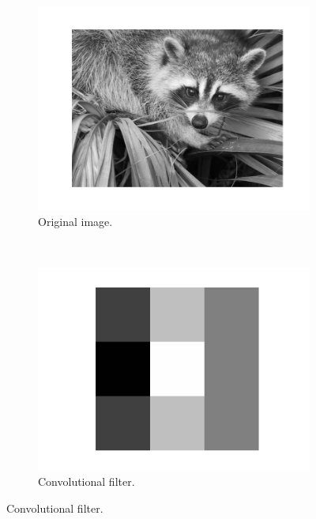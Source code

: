         \begin{figure}
            \centering
            \begin{subfigure}[t]{0.3\textwidth}
                \centering
                \includegraphics[width=\textwidth]{images/face.png}
                \caption{Original image.}
                \label{fig:convolution-face-original}
            \end{subfigure}%
            ~
            \begin{subfigure}[t]{0.3\textwidth}
                \centering
                \includegraphics[width=\textwidth]
                    {images/convolutional_filter.png}
                \caption{Convolutional filter.}
                \label{fig:convolution-face-filter}

\end{subfigure}
\end{figure}
